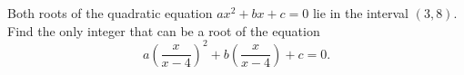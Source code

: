 Both roots of the quadratic equation $ax^2+bx+c=0$ lie in the interval $(3,8)$. Find the only integer that can be a root of the equation
\[
a\left(\dfrac{x}{x-4}\right)^2+b\left(\dfrac{x}{x-4}\right)+c=0 .
\]
